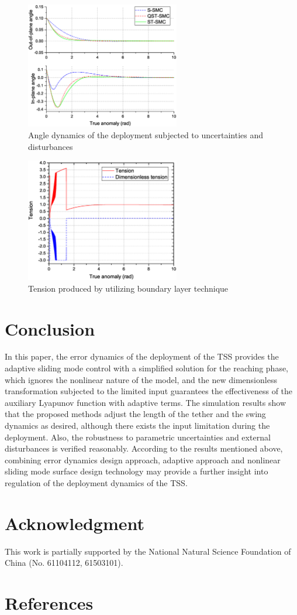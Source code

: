 \documentclass[3p]{elsarticle}
\theoremstyle{plain}
\theoremstyle{remark}
\begin{document}
\begin{figure}
\centering
\includegraphics[width=0.6\textwidth]{paper4_fig9_20161025.eps}
\caption{Angle dynamics of the deployment subjected to uncertainties and disturbances}
\label{fig:9}
\end{figure}
\begin{figure}
\centering
\includegraphics[width=0.6\textwidth]{paper4_fig10_20161025.eps}
\caption{Tension produced by utilizing boundary layer technique}
\label{fig:10}
\end{figure}
\section{Conclusion}\label{sec:5}
In this paper, the error dynamics of the deployment of the TSS provides the adaptive sliding mode control with a simplified solution for the reaching phase, which ignores the nonlinear nature of the model, and the new dimensionless transformation subjected to the limited input guarantees the effectiveness of the auxiliary Lyapunov function with adaptive terms. The simulation results show that the proposed methods adjust the length of the tether and the swing dynamics as desired, although there exists the input limitation during the deployment. Also, the robustness to parametric uncertainties and external disturbances is verified reasonably. According to the results mentioned above, combining error dynamics design approach, adaptive approach and nonlinear sliding mode surface design technology may provide a further insight into regulation of the deployment dynamics of the TSS.
\section{Acknowledgment}
This work is partially supported by the National Natural Science Foundation of China (No. 61104112, 61503101).
\section{References}


\end{document}
